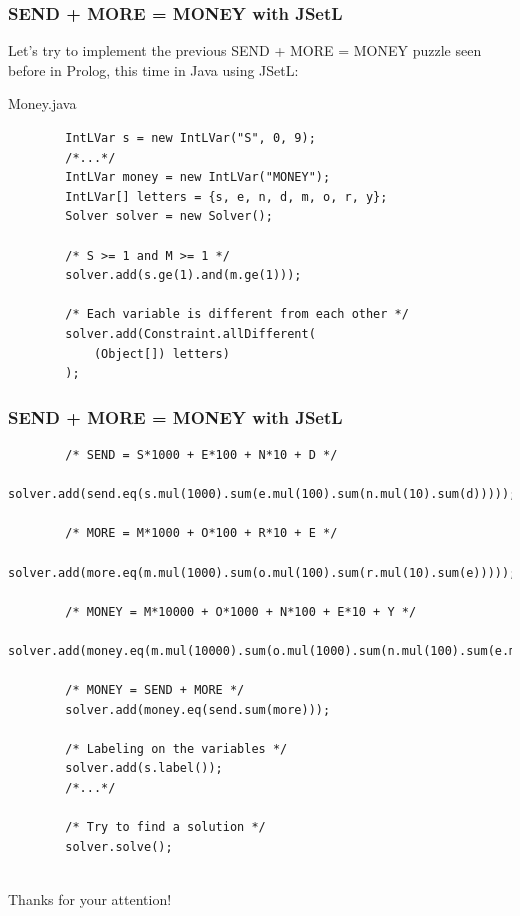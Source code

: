 \documentclass{beamer}
\begin{document}
\begin{frame}[fragile]
\frametitle{SEND + MORE = MONEY with JSetL}
Let's try to implement the previous SEND + MORE = MONEY puzzle seen before in Prolog, this time in Java using JSetL:\\
\begin{exampleblock}{Money.java}
\begin{lstlisting}
		IntLVar s = new IntLVar("S", 0, 9);
		/*...*/
		IntLVar money = new IntLVar("MONEY");
		IntLVar[] letters = {s, e, n, d, m, o, r, y};
		Solver solver = new Solver();
		
		/* S >= 1 and M >= 1 */
		solver.add(s.ge(1).and(m.ge(1)));

		/* Each variable is different from each other */
		solver.add(Constraint.allDifferent(
			(Object[]) letters)
		);
\end{lstlisting}
\end{exampleblock}
\end{frame}

\begin{frame}[fragile]
\frametitle{SEND + MORE = MONEY with JSetL}
\begin{lstlisting}
		/* SEND = S*1000 + E*100 + N*10 + D */
		solver.add(send.eq(s.mul(1000).sum(e.mul(100).sum(n.mul(10).sum(d)))));
		
		/* MORE = M*1000 + O*100 + R*10 + E */
		solver.add(more.eq(m.mul(1000).sum(o.mul(100).sum(r.mul(10).sum(e)))));
		
		/* MONEY = M*10000 + O*1000 + N*100 + E*10 + Y */
		solver.add(money.eq(m.mul(10000).sum(o.mul(1000).sum(n.mul(100).sum(e.mul(10).sum(y))))));
		
		/* MONEY = SEND + MORE */
		solver.add(money.eq(send.sum(more)));
		
		/* Labeling on the variables */
		solver.add(s.label());
		/*...*/
		
		/* Try to find a solution */
		solver.solve();
	
\end{lstlisting}
\end{frame}

\begin{frame}{  }
\centering \huge Thanks for your attention!
\end{frame}
\end{document}
